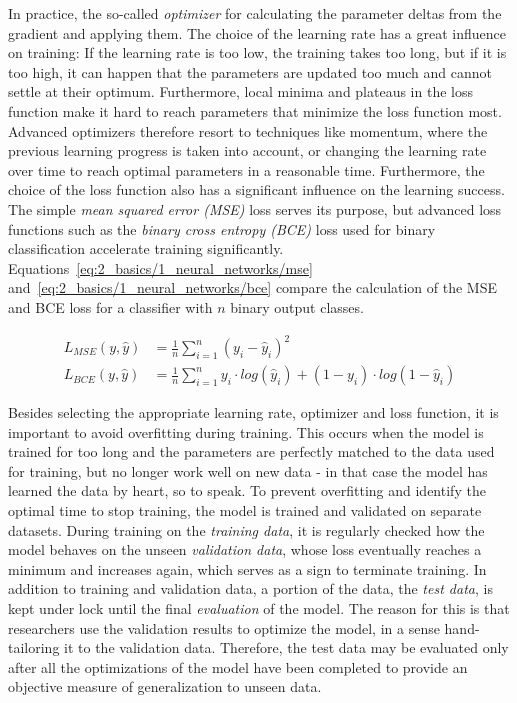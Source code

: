 In practice, the so-called \emph{optimizer} for calculating the parameter deltas from the gradient and applying them. The choice of the learning rate has a great influence on training: If the learning rate is too low, the training takes too long, but if it is too high, it can happen that the parameters are updated too much and cannot settle at their optimum. Furthermore, local minima and plateaus in the loss function make it hard to reach parameters that minimize the loss function most. Advanced optimizers therefore resort to techniques like momentum, where the previous learning progress is taken into account, or changing the learning rate over time to reach optimal parameters in a reasonable time. Furthermore, the choice of the loss function also has a significant influence on the learning success. The simple \emph{mean squared error (MSE)} loss serves its purpose, but advanced loss functions such as the \emph{binary cross entropy (BCE)} loss used for binary classification accelerate training significantly. Equations~\ref{eq:2_basics/1_neural_networks/mse} and~\ref{eq:2_basics/1_neural_networks/bce} compare the calculation of the MSE and BCE loss for a classifier with $n$ binary output classes.

\begin{align}
    L_{MSE}(y, \hat{y}) &= \frac{1}{n} \sum_{i=1}^n (y_i - \hat{y}_i)^2
    \label{eq:2_basics/1_neural_networks/mse} \\
    L_{BCE}(y, \hat{y}) &= \frac{1}{n} \sum_{i=1}^n y_i \cdot log( \hat{y}_i) + (1-y_i) \cdot log(1 - \hat{y}_i)
    \label{eq:2_basics/1_neural_networks/bce}
\end{align}

Besides selecting the appropriate learning rate, optimizer and loss function, it is important to avoid overfitting during training. This occurs when the model is trained for too long and the parameters are perfectly matched to the data used for training, but no longer work well on new data - in that case the model has learned the data by heart, so to speak. To prevent overfitting and identify the optimal time to stop training, the model is trained and validated on separate datasets. During training on the \emph{training data}, it is regularly checked how the model behaves on the unseen \emph{validation data}, whose loss eventually reaches a minimum and increases again, which serves as a sign to terminate training. In addition to training and validation data, a portion of the data, the \emph{test data}, is kept under lock until the final \emph{evaluation} of the model. The reason for this is that researchers use the validation results to optimize the model, in a sense hand-tailoring it to the validation data. Therefore, the test data may be evaluated only after all the optimizations of the model have been completed to provide an objective measure of generalization to unseen data.

